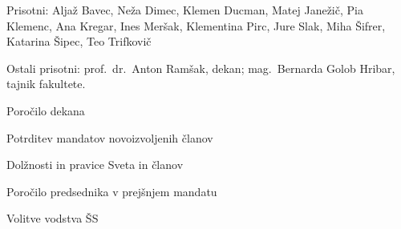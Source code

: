 \documentclass{seja}
\begin{document}
Prisotni:
Aljaž Bavec,
Neža Dimec,
Klemen Ducman,
Matej Janežič,
Pia Klemenc,
Ana Kregar,
Ines Meršak,
Klementina Pirc,
Jure Slak,
Miha Šifrer,
Katarina Šipec,
Teo Trifkovič

Ostali prisotni: prof.~dr.~Anton Ramšak, dekan; mag.~Bernarda Golob Hribar, tajnik fakultete.

\begin{red*}
  \item Poročilo dekana
  \item Potrditev mandatov novoizvoljenih članov
  \item Dolžnosti in pravice Sveta in članov
  \item Poročilo predsednika v prejšnjem mandatu
  \item Volitve vodstva ŠS
\end{red*}
\end{document}
